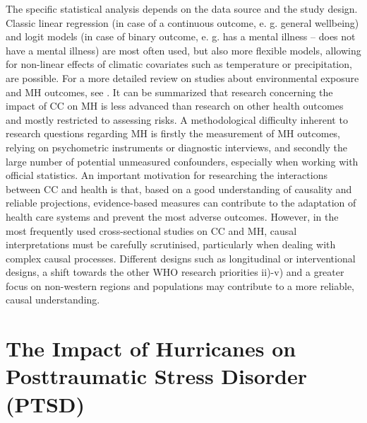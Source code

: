 \documentclass[
]{krantz}
\begin{document}
The specific statistical analysis depends on the data source and the study design. Classic linear regression (in case of a continuous outcome, e. g. general wellbeing) and logit models (in case of binary outcome, e. g. has a mental illness -- does not have a mental illness) are most often used, but also more flexible models, allowing for non-linear effects of climatic covariates such as temperature or precipitation, are possible.
For a more detailed review on studies about environmental exposure and MH outcomes, see \citet{charlson2021}.
It can be summarized that research concerning the impact of CC on MH is less advanced than research on other health outcomes and mostly restricted to assessing risks. A methodological difficulty inherent to research questions regarding MH is firstly the measurement of MH outcomes, relying on psychometric instruments or diagnostic interviews, and secondly the large number of potential unmeasured confounders, especially when working with official statistics.
An important motivation for researching the interactions between CC and health is that, based on a good understanding of causality and reliable projections, evidence-based measures can contribute to the adaptation of health care systems and prevent the most adverse outcomes. However, in the most frequently used cross-sectional studies on CC and MH, causal interpretations must be carefully scrutinised, particularly when dealing with complex causal processes. Different designs such as longitudinal or interventional designs, a shift towards the other WHO research priorities ii)-v) and a greater focus on non-western regions and populations may contribute to a more reliable, causal understanding.

\section{The Impact of Hurricanes on Posttraumatic Stress Disorder (PTSD)}\label{the-impact-of-hurricanes-on-posttraumatic-stress-disorder-ptsd}
\end{document}
